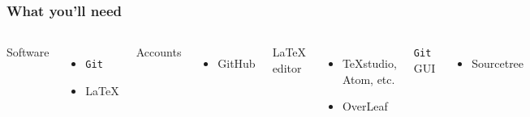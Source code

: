 \documentclass{beamer}
\begin{document}
\begin{frame}
    \frametitle{What you'll need}

\begin{columns}


Software
    \begin{itemize}
        \item \texttt{Git}
        \item \LaTeX
    \end{itemize}
Accounts
    \begin{itemize}
        \item GitHub\footnotemark
    \end{itemize}

\LaTeX{} editor
    \begin{itemize}
        \item TeXstudio, Atom, etc.
        \item OverLeaf
    \end{itemize}
\texttt{Git} GUI
    \begin{itemize}
        \item Sourcetree
    \end{itemize}

   \begin{figure}
    \centering
    \includegraphics[width = 0.9\textwidth]{figs/phd101212s.png}
  \end{figure}
\end{columns}
\end{frame}
\end{document}
